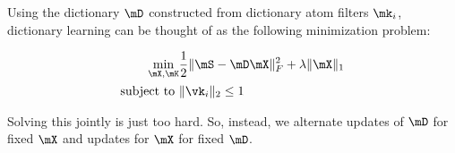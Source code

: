\documentclass{article}
\begin{document}
Using the dictionary $\mD$ constructed from dictionary atom filters $\mk_i$, dictionary learning can be thought of as the following minimization problem:

\begin{equation}
\begin{aligned}
\min_{\mX,\mK} & \frac{1}{2}\|\mS - \mD\mX\|_F^2 + \lambda\|\mX\|_1\\
\text{subject to } & \|\vk_i\|_2 \leq 1
\end{aligned}
\end{equation}

Solving this jointly is just too hard. So, instead, we alternate updates of $\mD$ for fixed $\mX$ and updates for $\mX$ for fixed $\mD$.
\end{document}
